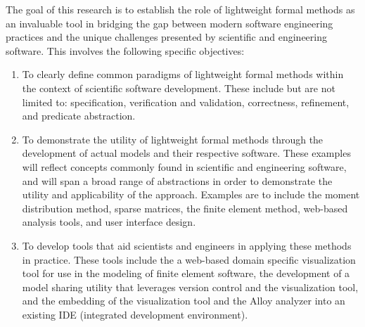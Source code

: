 \documentclass[../../proposal.tex]{subfiles}
\begin{document}
The goal of this research is to establish the role of lightweight formal methods as an invaluable tool in bridging the gap between modern software engineering practices and the unique challenges presented by scientific and engineering software.  This involves the following specific objectives:

\begin{enumerate}

    \item To clearly define common paradigms of lightweight formal methods within the context of scientific software development.  These include but are not limited to: specification, verification and validation, correctness, refinement, and predicate abstraction.
    
    \item To demonstrate the utility of lightweight formal methods through the development of actual models and their respective software.  These examples will reflect concepts commonly found in scientific and engineering software, and will span a broad range of abstractions in order to demonstrate the utility and applicability of the approach.  Examples are to include the moment distribution method, sparse matrices, the finite element method, web-based analysis tools, and user interface design.

    \item To develop tools that aid scientists and engineers in applying these methods in practice.  These tools include the a web-based domain specific visualization tool for use in the modeling of finite element software, the development of a model sharing utility that leverages version control and the visualization tool, and the embedding of the visualization tool and the Alloy analyzer into an existing IDE (integrated development environment).

\end{enumerate}
\end{document}
